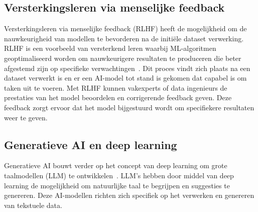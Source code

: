 \subsection{Versterkingsleren via menselijke feedback}
\label{subsec:versterkingsleren-via-menselijke-feedback}
Versterkingsleren via menselijke feedback (RLHF) heeft de mogelijkheid om de nauwkeurigheid van modellen te bevorderen na de initi\"ele dataset verwerking.
RLHF is een voorbeeld van versterkend leren waarbij ML-algoritmen geoptimaliseerd worden om nauwkeurigere resultaten te produceren die beter afgestemd zijn op specifieke verwachtingen~\autocite{Balakrishnan2024}.
Dit proces vindt zich plaats na een dataset verwerkt is en er een AI-model tot stand is gekomen dat capabel is om taken uit te voeren.
Met RLHF kunnen vakexperts of data ingenieurs de prestaties van het model beoordelen en corrigerende feedback geven.
Deze feedback zorgt ervoor dat het model bijgestuurd wordt om specifiekere resultaten weer te geven.

\subsection{Generatieve AI en deep learning}
\label{subsec:generatieve-ai-en-deep-learning}
Generatieve AI bouwt verder op het concept van deep learning om grote taalmodellen (LLM) te ontwikkelen~\autocite{Shen2024}.
LLM's hebben door middel van deep learning de mogelijkheid om natuurlijke taal te begrijpen en suggesties te genereren.
Deze AI-modellen richten zich specifiek op het verwerken en genereren van tekstuele data.